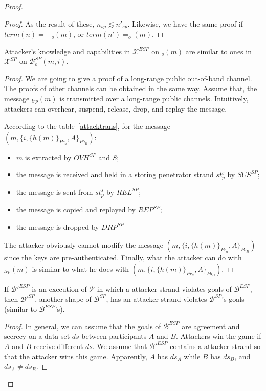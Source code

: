 \begin{Definition}
\begin{table}[b]
\begin{proof}
\begin{proof}
As the result of these, $n_{sp} \lesssim n'_{sp}$. Likewise, we have the same proof if $term(n)=-_o(m)$, or $term(n')= _o(m)$.
\end{proof}

\begin{Lemma}\label{sameattack}
Attacker's knowledge and capabilities in $\mathcal{X}^{ESP}$ on $_o(m)$ are similar to ones in $\mathcal{X}^{SP}$ on $\mathcal{B}^{SP}_o(m,i)$. 
\end{Lemma}
\begin{proof}
We are going to give a proof of a long-range public out-of-band channel. The proofs of other channels can be obtained in the same way. Assume that, the message $_{lrp}(m)$ is transmitted over a long-range public channels. Intuitively, attackers can overhear, suspend, release, drop, and replay the message. 

According to the table~\ref{attacktrans}, for the message $(m, \{i,\{h(m)\}_{Pr_a},A\}_{Pb_B})$:
\begin{itemize}
\item $m$ is extracted by $OVH^{SP}$ and $S$;
\item the message is received and held in a storing penetrator strand $st^s_p$ by $SUS^{SP}$;
\item the message is sent from $st^s_p$ by $REL^{SP}$;
\item the message is copied and replayed by $REP^{SP}$;
\item the message is dropped by $DRP^{SP}$
\end{itemize}

The attacker obviously cannot modify the message $(m, \{i,\{h(m)\}_{Pr_a},A\}_{Pb_B})$ since the keys are pre-authenticated. Finally, what the attacker can do with $_{lrp}(m)$ is similar to what he does with $(m, \{i,\{h(m)\}_{Pr_a},A\}_{Pb_B})$.
\end{proof}

\begin{Lemma}\label{lemma514}
If $\mathcal{B'}^{ESP}$ is an execution of $\mathcal{P}$ in which a attacker strand violates goals of $\mathcal{B}^{ESP}$, then $\mathcal{B'}^{SP}$, another shape of $\mathcal{B}^{SP}$, has an attacker strand violates $\mathcal{B}^{SP}$'s goals (similar to $\mathcal{B}^{ESP}$'s).
\end{Lemma}

\begin{proof}
In general, we can assume that the goals of $\mathcal{B}^{ESP}$ are agreement and secrecy on a data set $ds$ between participants $A$ and $B$.  Attackers win the game if $A$ and $B$ receive different $ds$. We assume that $\mathcal{B'}^{ESP}$ contains a attacker strand so that the attacker wins this game. Apparently, $A$ has $ds_A$ while $B$ has $ds_B$, and $ds_A \not= ds_B$. 


\end{proof}
\end{proof}
\end{table}
\end{Definition}
